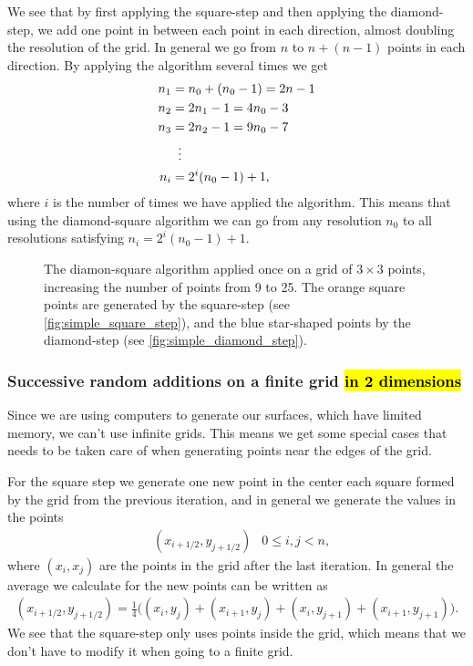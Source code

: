 We see that by first applying the square-step and then applying the diamond-step, we add one point in between each point in each direction, almost doubling the resolution of the grid. In general we go from $n$ to $n + (n-1)$ points in each direction. By applying the algorithm several times we get 
\begin{align}
    n_1 &= n_0 + (n_0-1) = 2n - 1 \nonumber\\
    n_2 &= 2n_1 - 1 = 4n_0 - 3 \nonumber\\
    n_3 &= 2n_2 - 1 = 9n_0 - 7 \nonumber\\
    &\vdotswithin{=} \nonumber\\
    n_i &= 2^i(n_0-1) + 1, \label{eq:diamond_step_resolution}
\end{align}
where $i$ is the number of times we have applied the algorithm. This means that using the diamond-square algorithm we can go from any resolution $n_0$ to all resolutions satisfying $n_i = 2^i(n_0 - 1) + 1$.

\begin{figure}
    \centering
    
    \caption{
        The diamon-square algorithm applied once on a grid of $3\times 3$ points, increasing the number of points from 9 to 25. The orange square points are generated by the square-step (see \cref{fig:simple_square_step}), and the blue star-shaped points by the diamond-step (see \cref{fig:simple_diamond_step}).
    }
    \label{fig:diamond_square_applied}
\end{figure}

\subsubsection{Successive random additions on a finite grid \hl{in 2 dimensions}}
Since we are using computers to generate our surfaces, which have limited memory, we can't use infinite grids. This means we get some special cases that needs to be taken care of when generating points near the edges of the grid.

For the square step we generate one new point in the center each square formed by the grid from the previous iteration, and in general we generate the values in the points
\begin{align*}
    &\left(x_{i+1/2}, y_{j+1/2}\right) &0\leq i,j < n,
\end{align*}
where $(x_i,x_j)$ are the points in the grid after the last iteration. In general the average we calculate for the new points can be written as
\begin{align*}
    (x_{i+1/2}, y_{j+1/2}) 
    = \frac{1}{4}\big(
        (x_i, y_j) + (x_{i+1}, y_j) + (x_i, y_{j+1}) + (x_{i+1}, y_{j+1})
    \big).
\end{align*}
We see that the square-step only uses points inside the grid, which means that we don't have to modify it when going to a finite grid.


